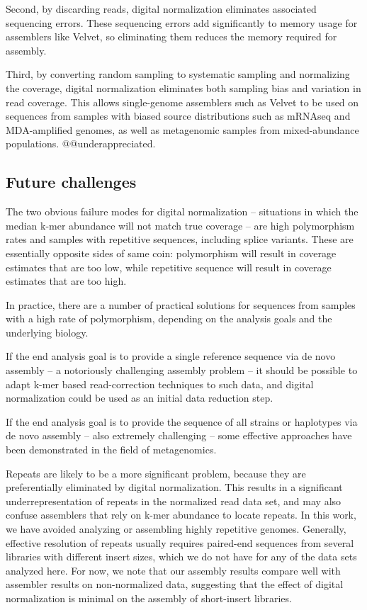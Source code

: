 \documentclass[10pt,draft]{article}
\begin{document}
Second, by discarding reads, digital normalization eliminates
associated sequencing errors.  These sequencing errors add
significantly to memory usage for assemblers like Velvet, so
eliminating them reduces the memory required for assembly.

Third, by converting random sampling to systematic sampling and
normalizing the coverage, digital normalization eliminates both
sampling bias and variation in read coverage.  This allows
single-genome assemblers such as Velvet to be used on sequences from
samples with biased source distributions such as mRNAseq and
MDA-amplified genomes, as well as metagenomic samples from
mixed-abundance populations. @@underappreciated.

\subsection*{Future challenges}

The two obvious failure modes for digital normalization -- situations
in which the median k-mer abundance will not match true coverage --
are high polymorphism rates and samples with repetitive sequences,
including splice variants.  These are essentially opposite sides of
same coin: polymorphism will result in coverage estimates that are too
low, while repetitive sequence will result in coverage estimates that
are too high.

In practice, there are a number of practical solutions for sequences
from samples with a high rate of polymorphism, depending on the
analysis goals and the underlying biology.

If the end analysis goal is to provide a single reference sequence via
de novo assembly -- a notoriously challenging assembly problem -- it
should be possible to adapt k-mer based read-correction techniques to
such data, and digital normalization could be used as an initial data
reduction step.

If the end analysis goal is to provide the sequence of all strains or
haplotypes via de novo assembly -- also extremely challenging -- some
effective approaches have been demonstrated in the field of
metagenomics.

Repeats are likely to be a more significant problem, because they are
preferentially eliminated by digital normalization.  This results in a
significant underrepresentation of repeats in the normalized read data
set, and may also confuse assemblers that rely on k-mer abundance to
locate repeats.  In this work, we have avoided analyzing or assembling
highly repetitive genomes.  Generally, effective resolution of repeats
usually requires paired-end sequences from several libraries with
different insert sizes, which we do not have for any of the data sets
analyzed here.  For now, we note that our assembly results compare
well with assembler results on non-normalized data, suggesting that
the effect of digital normalization is minimal on the assembly of
short-insert libraries.
\end{document}
